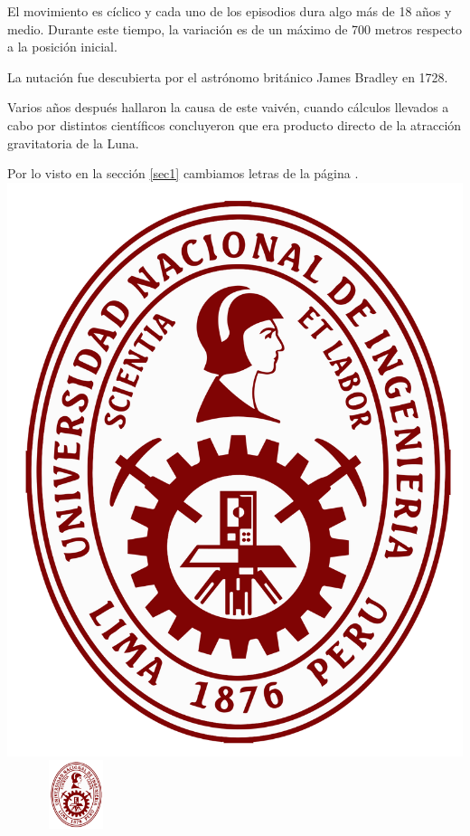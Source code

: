 \documentclass[12pt,a4paper]{article}
\begin{document}
	El movimiento es cíclico y cada uno de los episodios dura algo más de 18 años y medio. Durante este tiempo, 
	la variación es de un máximo de 700 metros respecto a la posición inicial.
	
	La nutación fue descubierta por el astrónomo británico James Bradley en 1728.
	
	Varios años después hallaron la causa de este vaivén, cuando cálculos llevados a cabo por distintos científicos 
	concluyeron que era producto directo de la atracción gravitatoria de la Luna.
	
	Por lo visto en la sección \ref{sec1} cambiamos letras de la página \pageref{sec1}.
\newpage
\includegraphics[scale=0.2]{escudo}
\includegraphics[width=4cm,height=2cm]{escudo}
\end{document}
